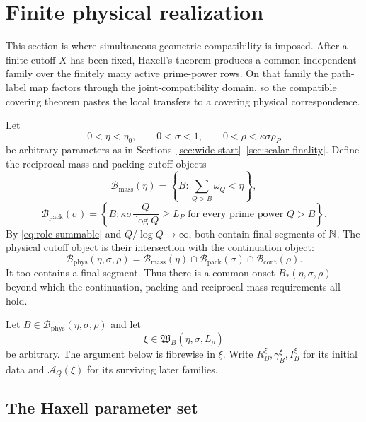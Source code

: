\section{Finite physical realization}
\label{sec:finite-realization}

This section is where simultaneous geometric compatibility is imposed.  After a finite cutoff $X$ has been fixed, Haxell's theorem produces a common independent family over the finitely many active prime-power rows.  On that family the path-label map factors through the joint-compatibility domain, so the compatible covering theorem pastes the local transfers to a covering physical correspondence.

Let
\[
0<\eta<\eta_0,
\qquad
0<\sigma<1,
\qquad
0<\rho<\kappa\sigma\rho_P
\]
be arbitrary parameters as in Sections~\ref{sec:wide-start}--\ref{sec:scalar-finality}.  Define the reciprocal-mass and packing cutoff objects
\[
\mathcal B_{\mathrm{mass}}(\eta)
=
\left\{B:\sum_{Q>B}\omega_Q<\eta\right\},
\]
\[
\mathcal B_{\mathrm{pack}}(\sigma)
=
\left\{B:
\kappa\sigma\frac Q{\log Q}\ge L_P
\text{ for every prime power }Q>B
\right\}.
\]
By \eqref{eq:role-summable} and $Q/\log Q\to\infty$, both contain final segments of $\mathbb N$.  The physical cutoff object is their intersection with the continuation object:
\begin{equation}\label{eq:global-start-cutoff}
\mathcal B_{\mathrm{phys}}(\eta,\sigma,\rho)
=
\mathcal B_{\mathrm{mass}}(\eta)
\cap
\mathcal B_{\mathrm{pack}}(\sigma)
\cap
\mathcal B_{\mathrm{cont}}(\rho).
\end{equation}
It too contains a final segment.  Thus there is a common onset $B_*(\eta,\sigma,\rho)$ beyond which the continuation, packing and reciprocal-mass requirements all hold.

Let $B\in\mathcal B_{\mathrm{phys}}(\eta,\sigma,\rho)$ and let
\[
\xi\in\mathfrak W_B(\eta,\sigma,L_\rho)
\]
be arbitrary.  The argument below is fibrewise in $\xi$.  Write $R_B^\xi,\gamma_B^\xi,I_B^\xi$ for its initial data and $\mathcal A_Q(\xi)$ for its surviving later families.

\subsection{The Haxell parameter set}

